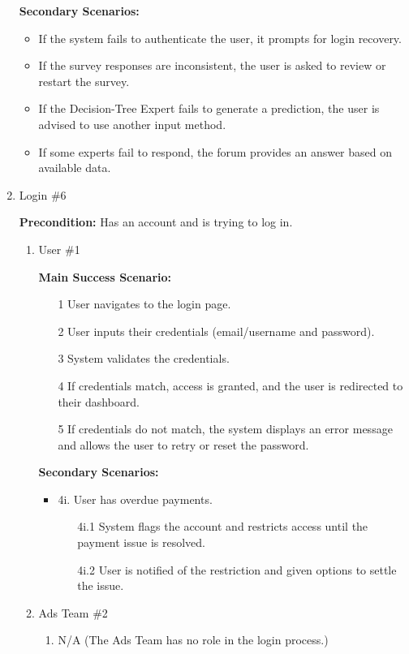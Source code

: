 \documentclass[]{article}
\begin{document}
\begin{enumerate}[{\bf BE1.}]
\textbf{Secondary Scenarios:}
\begin{itemize}
    \item If the system fails to authenticate the user, it prompts for login recovery.
    \item If the survey responses are inconsistent, the user is asked to review or restart the survey.
    \item If the Decision-Tree Expert fails to generate a prediction, the user is advised to use another input method.
    \item If some experts fail to respond, the forum provides an answer based on available data.
\end{itemize}
 
 
\item Login \#6
 
\textbf{Precondition:} Has an account and is trying to log in.
 
\begin{enumerate}[{\bf VP1.}]
\item User \#1 \
 
    \textbf{Main Success Scenario:}
    \begin{enumerate}
        \item[1] User navigates to the login page.
        \item[2] User inputs their credentials (email/username and password).
        \item[3] System validates the credentials.
        \item[4] If credentials match, access is granted, and the user is redirected to their dashboard.
        \item[5] If credentials do not match, the system displays an error message and allows the user to retry or reset the password.
    \end{enumerate}
 
\textbf{Secondary Scenarios:}
\begin{itemize}
\item 4i. User has overdue payments.
\begin{enumerate}
\item[4i.1] System flags the account and restricts access until the payment issue is resolved.
\item[4i.2] User is notified of the restriction and given options to settle the issue.
\end{enumerate}
\end{itemize}
 
\item Ads Team \#2 \
\begin{enumerate}
\item N/A (The Ads Team has no role in the login process.)
\end{enumerate}
 

\end{enumerate}
\end{enumerate}
\end{document}
